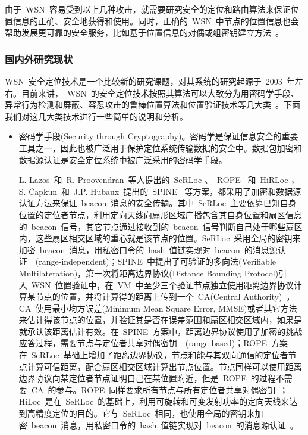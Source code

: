 \documentclass[a4paper,10pt]{article}
\begin{document}
由于~WSN~容易受到以上几种攻击，就需要研究安全的定位和路由算法来保证位置信息的正确、安全地获得和使用。同时，正确的~WSN~中节点的位置信息也会帮助发展更可靠的安全服务，比如基于位置信息的对偶或组密钥建立方法~\cite{Liu2003,Huang2004}。

\subsubsection{国内外研究现状}  

WSN~安全定位技术是一个比较新的研究课题，对其系统的研究起源于~2003~年左右。目前来讲，~WSN~的安全定位技术按照其算法可以大致分为用密码学手段、异常行为检测和屏蔽、容忍攻击的鲁棒位置算法和位置验证技术等几大类~\cite{Boukerche2008}。下面我们对这几大类技术进行一些简单的说明和分析。

\begin{itemize}

\item 密码学手段(Security through Cryptography)。密码学是保证信息安全的重要工具之一，因此也被广泛用于保护定位系统传输数据的安全中。数据包加密和数据源认证是安全定位系统中被广泛采用的密码学手段。

L. Lazos~和~R. Proovendran~等人提出的~SeRLoc \cite{Lazos2005}、~ROPE \cite{Lazos2006}~和~HiRLoc \cite{Lazos2005a}，S. \v{C}apkun~和~J.P. Hubaux~提出的~SPINE \cite{Capkun2005, Capkun2006}~等方案，都采用了加密和数据源认证方法来保证~beacon~消息的安全传输。其中~SeRLoc~主要依靠已知自身位置的定位者节点，利用定向天线向扇形区域广播包含其自身位置和扇区信息的~beacon~信号，其它节点通过接收到的~beacon~信号判断自己处于哪些扇区内，这些扇区相交区域的重心就是该节点的位置。SeRLoc~采用全局的密钥来加密~beacon~消息，用私密口令的~hash~值链实现对~beacon~的消息源认证~\cite{Lazos2005}~(range-independent)；SPINE~中提出了可验证的多向法(Verifiable Multilateration)，第一次将距离边界协议(Distance Bounding Protocol)引入~WSN~位置验证中，在~VM~中至少三个验证节点独立使用距离边界协议计算某节点的位置，并将计算得的距离上传到一个~CA(Central Authority)~，CA~使用最小均方误差(Minimum Mean Square Error, MMSE)或者其它方法来估计得该节点的位置，并验证其是否在误差范围和扇区相交区域内，如果是就承认该距离估计有效。在~SPINE~方案中，距离边界协议使用了加密的挑战应答过程，需要节点与定位者共享对偶密钥~\cite{Capkun2005}~(range-based)；ROPE~方案在~SeRLoc~基础上增加了距离边界协议，节点和能与其双向通信的定位者节点计算可信距离，配合扇区相交区域计算出节点位置。节点同样可以使用距离边界协议向某定位者节点证明自己在某位置附近，但是~ROPE~的过程不需要~CA~的参与。ROPE~同样要求所有节点与所有定位者共享对偶密钥~\cite{Lazos2006}；HiLoc~是在~SeRLoc~的基础上，利用可旋转和可变发射功率的定向天线来达到高精度定位的目的。它与~SeRLoc~相同，也使用全局的密钥来加密~beacon~消息，用私密口令的~hash~值链实现对~beacon~的消息源认证~\cite{Lazos2005a}。


\end{itemize}
\end{document}
